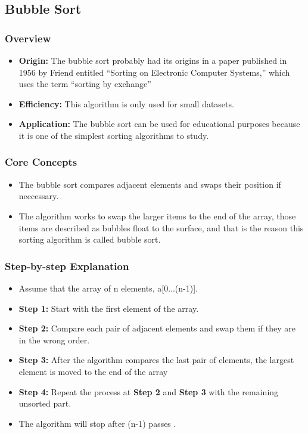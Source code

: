 \subsection[Bubble Sort]{Bubble Sort \cite{friend1956sorting}}
    \subsubsection{Overview}
        \begin{itemize}
            \item \textbf{Origin: } The bubble sort probably had its origins in a paper published in 1956 by Friend entitled “Sorting on Electronic Computer Systems,” which uses the term “sorting by exchange”
            \item \textbf{Efficiency: } This algorithm is only used for small datasets.
            \item \textbf{Application: } The bubble sort can be used for educational purposes because it is one of the simplest sorting algorithms to study.
        \end{itemize}
    \subsubsection{Core Concepts}
        \begin{itemize}
            \item The bubble sort compares adjacent elements and swaps their position if neccessary.
            \item The algorithm works to swap the larger items to the end of the array, those items are described as bubbles float to the surface, and that is the reason this sorting algorithm is called bubble sort.
        \end{itemize}
    \subsubsection{Step-by-step Explanation}
    \begin{itemize}
        \item Assume that the array of n elements, a[0...(n-1)].
        \item \textbf{Step 1: } Start with the first element of the array.
        \item \textbf{Step 2: } Compare each pair of adjacent elements and swap them if they are in the wrong order.
        \item \textbf{Step 3: } After the algorithm compares the last pair of elements, the largest element is moved to the end of the array
        \item \textbf{Step 4: } Repeat the process at \textbf{Step 2} and \textbf{Step 3} with the remaining unsorted part.
        \item The algorithm will stop after (n-1) passes .
    \end{itemize}
